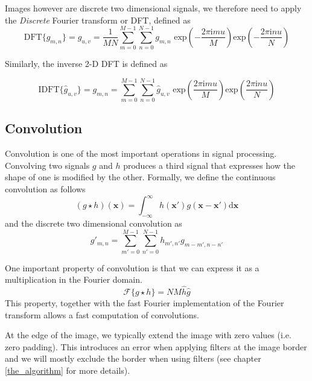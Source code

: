		Images however are discrete two dimensional signals, we therefore need to apply the \textit{Discrete} Fourier transform or DFT, defined as
		\begin{equation}
			\text{DFT}\{ g_{m,n} \} = \hat{g}_{u,v} = \dfrac{1}{MN} \sum_{m=0}^{M-1} \sum_{n=0}^{N-1}
			g_{m,n} \text{ exp} \left(  - \dfrac{2 \pi \text{i} m u}{M}  \right)
						\text{exp} \left(  - \dfrac{2 \pi \text{i} n u}{N}  \right)
		\end{equation}		 

		Similarly, the inverse 2-D DFT is defined as 
		
		\begin{equation}
		 \text{IDFT}\{\hat{g}_{u,v}\} = g_{m,n} = \sum_{m=0}^{M-1} \sum_{n=0}^{N-1} \hat{g}_{u,v}
			\text{ exp} \left(   \dfrac{2 \pi \text{i} m u}{M}  \right)
			\text{exp} \left(   \dfrac{2 \pi \text{i} n u}{N}  \right)
		\end{equation}
		
		
		\subsection{Convolution}
		Convolution is one of the most important operations in signal processing. Convolving two signals $g$ and $h$ produces a third signal that expresses how the shape of one is modified by the other. Formally, we define the continuous convolution as follows
		\begin{equation}
			(g \star h)(\mathbf{x}) = \int_{-\infty}^{\infty} 
			h(\mathbf{x}') g(\mathbf{x} - \mathbf{x}')
			\text{d}\mathbf{x}
		\end{equation}
		and the discrete two dimensional convolution as
		\begin{equation}
			g'_{m,n} = \sum_{m'=0}^{M-1} \sum_{n'=0}^{N-1}
			h_{m',n'} g_{m-m', n-n'}
		\end{equation}
		
		One important property of convolution is that we can express it as a multiplication in the Fourier domain. 
		\begin{equation}
		\mathscr{F}\{g \star h\} = N M \hat{h} \hat{g}
		\end{equation}
		This property, together with the fast Fourier implementation of the Fourier transform allows a fast computation of convolutions. 
		
		At the edge of the image, we typically extend the image with zero values (i.e. zero padding). This introduces an error when applying filters at the image border and we will mostly exclude the border when using filters (see chapter \ref{the_algorithm} for more details).
		
